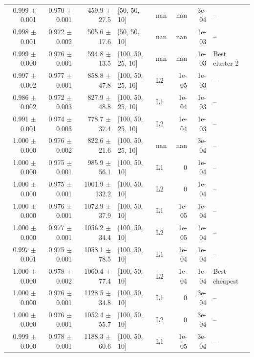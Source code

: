 \documentclass[reprint,english,notitlepage, floatfix]{revtex4-2}  %
\begin{document}
\begin{longtable}{r r r l l r r l}
\rowcolor{Cluster2} 0.999 $\pm$ 0.001 & 0.970 $\pm$ 0.001 & 459.9 $\pm$ 27.5 & [50, 50, 10] & nan & nan & 3e-04 & -- \\
\rowcolor{Cluster2} 0.998 $\pm$ 0.001 & 0.972 $\pm$ 0.002 & 505.6 $\pm$ 17.6 & [50, 50, 10] & nan & nan & 1e-03 & -- \\
\rowcolor{Cluster2} 0.999 $\pm$ 0.000 & 0.976 $\pm$ 0.001 & 594.8 $\pm$ 13.5 & [100, 50, 25, 10] & nan & nan & 1e-03 & Best cluster 2 \\
\rowcolor{Cluster3} 0.997 $\pm$ 0.002 & 0.977 $\pm$ 0.001 & 858.8 $\pm$ 47.8 & [100, 50, 25, 10] & L2 & 1e-05 & 1e-03 & -- \\
\rowcolor{Cluster3} 0.986 $\pm$ 0.002 & 0.972 $\pm$ 0.003 & 827.9 $\pm$ 48.8 & [100, 50, 25, 10] & L1 & 1e-04 & 1e-03 & -- \\
\rowcolor{Cluster3} 0.991 $\pm$ 0.001 & 0.974 $\pm$ 0.003 & 778.7 $\pm$ 37.4 & [100, 50, 25, 10] & L2 & 1e-04 & 1e-03 & -- \\
\rowcolor{Cluster3} 1.000 $\pm$ 0.000 & 0.976 $\pm$ 0.002 & 822.6 $\pm$ 21.6 & [100, 50, 25, 10] & nan & nan & 3e-04 & -- \\
\rowcolor{Cluster4} 1.000 $\pm$ 0.000 & 0.975 $\pm$ 0.001 & 985.9 $\pm$ 56.1 & [100, 50, 10] & L1 & 0 & 1e-04 & -- \\
\rowcolor{Cluster4} 1.000 $\pm$ 0.000 & 0.975 $\pm$ 0.001 & 1001.9 $\pm$ 132.2 & [100, 50, 10] & L2 & 0 & 1e-04 & -- \\
\rowcolor{Cluster4} 1.000 $\pm$ 0.000 & 0.976 $\pm$ 0.001 & 1072.9 $\pm$ 37.9 & [100, 50, 10] & L1 & 1e-05 & 1e-04 & -- \\
\rowcolor{Cluster4} 1.000 $\pm$ 0.000 & 0.977 $\pm$ 0.001 & 1056.2 $\pm$ 34.4 & [100, 50, 10] & L2 & 1e-05 & 1e-04 & -- \\
\rowcolor{Cluster4} 0.997 $\pm$ 0.001 & 0.975 $\pm$ 0.001 & 1058.1 $\pm$ 78.5 & [100, 50, 10] & L1 & 1e-04 & 1e-04 & -- \\
\rowcolor{Cluster4} 1.000 $\pm$ 0.000 & 0.978 $\pm$ 0.002 & 1060.4 $\pm$ 77.4 & [100, 50, 10] & L2 & 1e-04 & 1e-04 & Best cheapest \\
\rowcolor{Cluster4} 1.000 $\pm$ 0.000 & 0.976 $\pm$ 0.001 & 1128.5 $\pm$ 34.8 & [100, 50, 10] & L1 & 0 & 3e-04 & -- \\
\rowcolor{Cluster4} 1.000 $\pm$ 0.000 & 0.976 $\pm$ 0.001 & 1052.4 $\pm$ 55.7 & [100, 50, 10] & L2 & 0 & 3e-04 & -- \\
\rowcolor{Cluster4} 0.999 $\pm$ 0.000 & 0.978 $\pm$ 0.001 & 1188.3 $\pm$ 60.6 & [100, 50, 10] & L1 & 1e-05 & 3e-04 & -- \\

\end{longtable}
\end{document}
